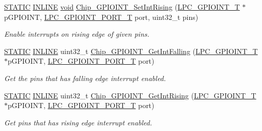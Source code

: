 \begin{DoxyCompactItemize}
\hyperlink{group__LPC__Types__Public__Macros_ga10b2d890d871e1489bb02b7e70d9bdfb}{S\-T\-A\-T\-I\-C} \hyperlink{group__LPC__Types__Public__Types_ga2eb6f9e0395b47b8d5e3eeae4fe0c116}{I\-N\-L\-I\-N\-E} \hyperlink{Paradigm_2Tern__EE_2small_2portmacro_8h_a14d32f8130d3c0b212cfc751730b5b49}{void} \hyperlink{group__GPIOINT__17XX__40XX_ga50cbadb361acd7190dc8edf5ffb9208c}{Chip\-\_\-\-G\-P\-I\-O\-I\-N\-T\-\_\-\-Set\-Int\-Rising} (\hyperlink{structLPC__GPIOINT__T}{L\-P\-C\-\_\-\-G\-P\-I\-O\-I\-N\-T\-\_\-\-T} $\ast$p\-G\-P\-I\-O\-I\-N\-T, \hyperlink{group__GPIOINT__17XX__40XX_ga41631ac5e33fde341c0afe680ded9fee}{L\-P\-C\-\_\-\-G\-P\-I\-O\-I\-N\-T\-\_\-\-P\-O\-R\-T\-\_\-\-T} port, uint32\-\_\-t pins)
\begin{DoxyCompactList}\small\item\em Enable interrupts on rising edge of given {\itshape pins}. \end{DoxyCompactList}\item 
\hyperlink{group__LPC__Types__Public__Macros_ga10b2d890d871e1489bb02b7e70d9bdfb}{S\-T\-A\-T\-I\-C} \hyperlink{group__LPC__Types__Public__Types_ga2eb6f9e0395b47b8d5e3eeae4fe0c116}{I\-N\-L\-I\-N\-E} uint32\-\_\-t \hyperlink{group__GPIOINT__17XX__40XX_ga151aaa1239b3f8b23be4c7c4238c7370}{Chip\-\_\-\-G\-P\-I\-O\-I\-N\-T\-\_\-\-Get\-Int\-Falling} (\hyperlink{structLPC__GPIOINT__T}{L\-P\-C\-\_\-\-G\-P\-I\-O\-I\-N\-T\-\_\-\-T} $\ast$p\-G\-P\-I\-O\-I\-N\-T, \hyperlink{group__GPIOINT__17XX__40XX_ga41631ac5e33fde341c0afe680ded9fee}{L\-P\-C\-\_\-\-G\-P\-I\-O\-I\-N\-T\-\_\-\-P\-O\-R\-T\-\_\-\-T} port)
\begin{DoxyCompactList}\small\item\em Get the pins that has falling edge interrupt enabled. \end{DoxyCompactList}\item 
\hyperlink{group__LPC__Types__Public__Macros_ga10b2d890d871e1489bb02b7e70d9bdfb}{S\-T\-A\-T\-I\-C} \hyperlink{group__LPC__Types__Public__Types_ga2eb6f9e0395b47b8d5e3eeae4fe0c116}{I\-N\-L\-I\-N\-E} uint32\-\_\-t \hyperlink{group__GPIOINT__17XX__40XX_ga087f70143b825e771bf9acb2d21794bf}{Chip\-\_\-\-G\-P\-I\-O\-I\-N\-T\-\_\-\-Get\-Int\-Rising} (\hyperlink{structLPC__GPIOINT__T}{L\-P\-C\-\_\-\-G\-P\-I\-O\-I\-N\-T\-\_\-\-T} $\ast$p\-G\-P\-I\-O\-I\-N\-T, \hyperlink{group__GPIOINT__17XX__40XX_ga41631ac5e33fde341c0afe680ded9fee}{L\-P\-C\-\_\-\-G\-P\-I\-O\-I\-N\-T\-\_\-\-P\-O\-R\-T\-\_\-\-T} port)
\begin{DoxyCompactList}\small\item\em Get pins that has rising edge interrupt enabled. \end{DoxyCompactList}\item 

\end{DoxyCompactItemize}

